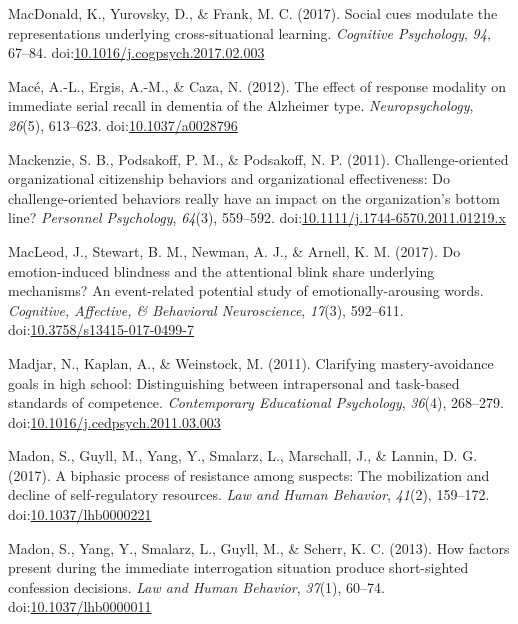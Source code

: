 \documentclass[english,man]{apa6}
\theoremstyle{definition}
\theoremstyle{definition}
\theoremstyle{definition}
\theoremstyle{remark}
\begin{document}
\hypertarget{ref-MacDonald2017}{}
MacDonald, K., Yurovsky, D., \& Frank, M. C. (2017). Social cues
modulate the representations underlying cross-situational learning.
\emph{Cognitive Psychology}, \emph{94}, 67--84.
doi:\href{https://doi.org/10.1016/j.cogpsych.2017.02.003}{10.1016/j.cogpsych.2017.02.003}

\hypertarget{ref-Mace2012}{}
Macé, A.-L., Ergis, A.-M., \& Caza, N. (2012). The effect of response
modality on immediate serial recall in dementia of the Alzheimer type.
\emph{Neuropsychology}, \emph{26}(5), 613--623.
doi:\href{https://doi.org/10.1037/a0028796}{10.1037/a0028796}

\hypertarget{ref-Mackenzie2011}{}
Mackenzie, S. B., Podsakoff, P. M., \& Podsakoff, N. P. (2011).
Challenge-oriented organizational citizenship behaviors and
organizational effectiveness: Do challenge-oriented behaviors really
have an impact on the organization's bottom line? \emph{Personnel
Psychology}, \emph{64}(3), 559--592.
doi:\href{https://doi.org/10.1111/j.1744-6570.2011.01219.x}{10.1111/j.1744-6570.2011.01219.x}

\hypertarget{ref-MacLeod2017}{}
MacLeod, J., Stewart, B. M., Newman, A. J., \& Arnell, K. M. (2017). Do
emotion-induced blindness and the attentional blink share underlying
mechanisms? An event-related potential study of emotionally-arousing
words. \emph{Cognitive, Affective, \& Behavioral Neuroscience},
\emph{17}(3), 592--611.
doi:\href{https://doi.org/10.3758/s13415-017-0499-7}{10.3758/s13415-017-0499-7}

\hypertarget{ref-Madjar2011}{}
Madjar, N., Kaplan, A., \& Weinstock, M. (2011). Clarifying
mastery-avoidance goals in high school: Distinguishing between
intrapersonal and task-based standards of competence. \emph{Contemporary
Educational Psychology}, \emph{36}(4), 268--279.
doi:\href{https://doi.org/10.1016/j.cedpsych.2011.03.003}{10.1016/j.cedpsych.2011.03.003}

\hypertarget{ref-Madon2017}{}
Madon, S., Guyll, M., Yang, Y., Smalarz, L., Marschall, J., \& Lannin,
D. G. (2017). A biphasic process of resistance among suspects: The
mobilization and decline of self-regulatory resources. \emph{Law and
Human Behavior}, \emph{41}(2), 159--172.
doi:\href{https://doi.org/10.1037/lhb0000221}{10.1037/lhb0000221}

\hypertarget{ref-Madon2013}{}
Madon, S., Yang, Y., Smalarz, L., Guyll, M., \& Scherr, K. C. (2013).
How factors present during the immediate interrogation situation produce
short-sighted confession decisions. \emph{Law and Human Behavior},
\emph{37}(1), 60--74.
doi:\href{https://doi.org/10.1037/lhb0000011}{10.1037/lhb0000011}
\end{document}
